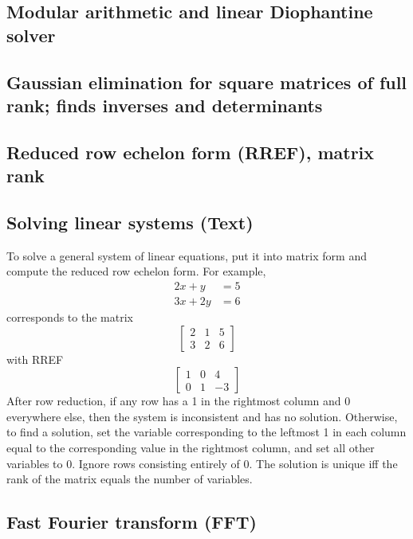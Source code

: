 \documentclass[9pt]{extarticle}
\begin{document}
\begin{multicols*}{3}
\subsection{Modular arithmetic and linear Diophantine solver} %


\subsection{Gaussian elimination for square matrices of full rank; finds
inverses and determinants} %


\subsection{Reduced row echelon form (RREF), matrix rank} %


\subsection{Solving linear systems (Text)} %
To solve a general system of linear equations, put it into matrix form and
compute the reduced row echelon form. For example,
\begin{align*}2x + y &= 5 \\ 3x + 2y &= 6\end{align*}
corresponds to the matrix
\[ \left[ \begin{array}{cc|c} 2 & 1 & 5 \\ 3 & 2 & 6 \end{array} \right] \]
with RREF
\[ \left[ \begin{array}{cc|c} 1 & 0 & 4 \\ 0 & 1 & -3 \end{array} \right] \]
After row reduction, if any row has a 1 in the rightmost column and 0
everywhere else, then the system is inconsistent and has no solution.
Otherwise, to find a solution, set the variable corresponding to the leftmost 1
in each column equal to the corresponding value in the rightmost column, and
set all other variables to 0. Ignore rows consisting entirely of 0. The
solution is unique iff the rank of the matrix equals the number of variables.

\subsection{Fast Fourier transform (FFT)} %



\end{multicols*}
\end{document}
